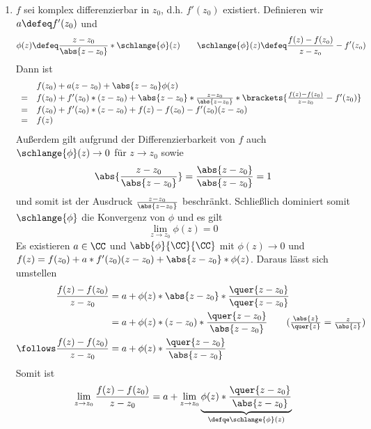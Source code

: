 \begin{exercisePage}
\begin{enumerate}[leftmargin=*, label=(zu \alph*)]
	\item \begin{equivalence}
		\hinrichtung $f$ sei komplex differenzierbar in $z_0$, d.h. $f'(z_0)$ existiert. Definieren wir $a \defeq f'(z_0)$ und 
		\begin{equation*}
			\phi(z) \defeq \frac{z-z_0}{\abs{z-z_0}} * \schlange{\phi}(z) \quad \mit \quad  \schlange{\phi}(z) \defeq  \frac{f(z) - f(z_0)}{z-z_0} - f'(z_0)
		\end{equation*}
		Dann ist
		\begin{equation*}
			\begin{array}{rl}
			&f(z_0) + a(z-z_0) + \abs{z-z_0} \phi(z) \\
			=& 	f(z_0) + f'(z_0) * (z-z_0) + \abs{z-z_0} * \frac{z-z_0}{\abs{z-z_0}} * \brackets{\frac{f(z) - f(z_0)}{z-z_0}  - f'(z_0)}  \\
			=& f(z_0) + f'(z_0) * (z-z_0) + f(z) - f(z_0)  - f'(z_0) (z-z_0) \\
			=& f(z)
			\end{array}
		\end{equation*}
		Außerdem gilt aufgrund der Differenzierbarkeit von $f$ auch $\schlange{\phi}(z) \to 0$ für $z \to z_0$ sowie
		\begin{equation*}
			\abs{\frac{z-z_0}{\abs{z-z_0}}} = \frac{\abs{z-z_0}}{\abs{z-z_0}} = 1
		\end{equation*}
		und somit ist der Ausdruck $\frac{z-z_0}{\abs{z-z_0}}$ beschränkt. Schließlich dominiert somit $\schlange{\phi}$ die Konvergenz von $\phi$ und es gilt
		\begin{equation*}
			\lim_{z \to z_0} \phi(z) = 0
		\end{equation*}
		\rueckrichtung Es existieren $a \in \CC$ und $\abb{\phi}{\CC}{\CC}$ mit $\phi(z) \to 0$ und $f(z) = f(z_0) + a * f'(z_0) (z-z_0) + \abs{z-z_0} * \phi(z)$. Daraus lässt sich umstellen
		\begin{align*}
				\frac{f(z) - f(z_0)}{z-z_0} 
				&= a + \phi(z) * \abs{z-z_0} * \frac{\quer{z-z_0}}{\quer{z-z_0}} \\
				&= a + \phi(z) * (z-z_0) * \frac{\quer{z-z_0}}{\abs{z-z_0}} \tag{$\frac{\abs{z}}{\quer{z}} = \frac{z}{\abs{z}}$}\\
				\follows \frac{f(z) - f(z_0)}{z-z_0} &= a + \phi(z) * \frac{\quer{z-z_0}}{\abs{z-z_0}}
		\end{align*}
		Somit ist 
		\begin{equation*}
			\lim_{z \to z_0} \frac{f(z) - f(z_0)}{z-z_0} = a + \lim_{z \to z_0} \underbrace{\phi(z) * \frac{\quer{z-z_0}}{\abs{z-z_0}}}_{\defqe \schlange{\phi}(z)}

\end{equation*}
\end{equivalence}
\end{enumerate}
\end{exercisePage}
